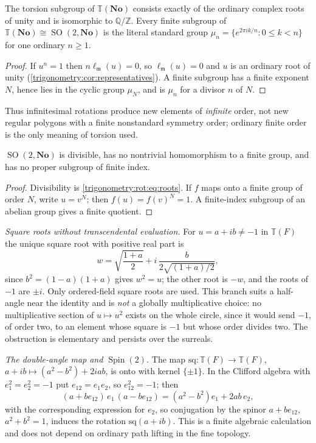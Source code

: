 \documentclass[11pt,letterpaper]{article}
\numberwithin{equation}{section}
\theoremstyle{definition}
\theoremstyle{remark}
\newcommand{\No}{\mathbf{No}}
\newcommand{\Q}{\mathbb Q}
\newcommand{\Z}{\mathbb Z}
\newcommand{\mm}{\mathfrak m}
\newcommand{\TT}{\mathbb T}
\newcommand{\SO}{\operatorname{SO}}
\newcommand{\ellm}{\ell_{\mm}}
\begin{document}
\begin{corollary}\label{trigonometry:rot:cor:torsion}
The torsion subgroup of $\TT(\No)$ consists exactly of the ordinary complex roots of unity and is
isomorphic to $\Q/\Z$. Every finite subgroup of $\TT(\No)\cong\SO(2,\No)$ is the literal standard
group $\mu_n=\{e^{2\pi ik/n}:0\le k<n\}$ for one ordinary $n\ge1$.
\end{corollary}
\begin{proof}
If $u^n=1$ then $n\ellm(u)=0$, so $\ellm(u)=0$ and $u$ is an ordinary root of unity
(\cref{trigonometry:cor:representatives}). A finite subgroup has a finite exponent $N$, hence lies
in the cyclic group $\mu_N$, and is $\mu_n$ for a divisor $n$ of $N$.
\end{proof}
Thus infinitesimal rotations produce new elements of \emph{infinite} order, not new regular polygons
with a finite nonstandard symmetry order; ordinary finite order is the only meaning of torsion used.

\begin{corollary}[Divisibility]\label{trigonometry:rot:cor:divisible}
$\SO(2,\No)$ is divisible, has no nontrivial homomorphism to a finite group, and has no proper
subgroup of finite index.
\end{corollary}
\begin{proof}
Divisibility is \cref{trigonometry:rot:eq:roots}. If $f$ maps onto a finite group of order $N$,
write $u=v^N$; then $f(u)=f(v)^N=1$. A finite-index subgroup of an abelian group gives a finite
quotient.
\end{proof}

\emph{Square roots without transcendental evaluation.} For $u=a+ib\ne-1$ in $\TT(F)$ the unique
square root with positive real part is
\begin{equation}\label{trigonometry:rot:eq:sqrt}
 w=\sqrt{\frac{1+a}2}+i\,\frac{b}{2\sqrt{(1+a)/2}},
\end{equation}
since $b^2=(1-a)(1+a)$ gives $w^2=u$; the other root is $-w$, and the roots of $-1$ are $\pm i$. Only
ordered-field square roots are used. This branch suits a half-angle near the identity and is
\emph{not} a globally multiplicative choice: no multiplicative section of $u\mapsto u^2$ exists on
the whole circle, since it would send $-1$, of order two, to an element whose square is $-1$ but
whose order divides two. The obstruction is elementary and persists over the surreals.

\emph{The double-angle map and $\operatorname{Spin}(2)$.} The map
$\mathrm{sq}:\TT(F)\to\TT(F)$, $a+ib\mapsto(a^2-b^2)+2iab$, is onto with kernel $\{\pm1\}$. In the
Clifford algebra with $e_1^2=e_2^2=-1$ put $e_{12}=e_1e_2$, so $e_{12}^2=-1$; then
\begin{equation}\label{trigonometry:rot:eq:spin}
 (a+be_{12})\,e_1\,(a-be_{12})=(a^2-b^2)e_1+2ab\,e_2 ,
\end{equation}
with the corresponding expression for $e_2$, so conjugation by the spinor $a+be_{12}$, $a^2+b^2=1$,
induces the rotation $\mathrm{sq}(a+ib)$. This is a finite algebraic calculation and does not depend
on ordinary path lifting in the fine topology.
\end{document}
